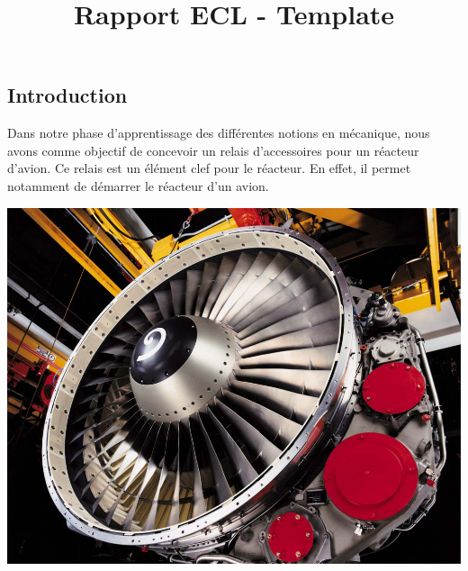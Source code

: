 \documentclass{config}
\title{Rapport ECL - Template} %
\begin{document}
\lstset{language=[x86masm]Assembler} 
\begin{spacing}{1.2}




        
\fairemarges %
\fairepagedegarde %
\tabledematieres %






\newpage
\section{Introduction}

Dans notre phase d'apprentissage des différentes notions en mécanique, nous avons comme objectif de concevoir un relais d'accessoires pour un réacteur d'avion.
Ce relais est un élément clef pour le réacteur. En effet, il permet notamment de démarrer le réacteur d'un avion.



\begin{center}
\includegraphics[scale=0.4]{CFM56-3C1-CFMi.jpg}
\end{center}


\end{spacing}
\end{document}

